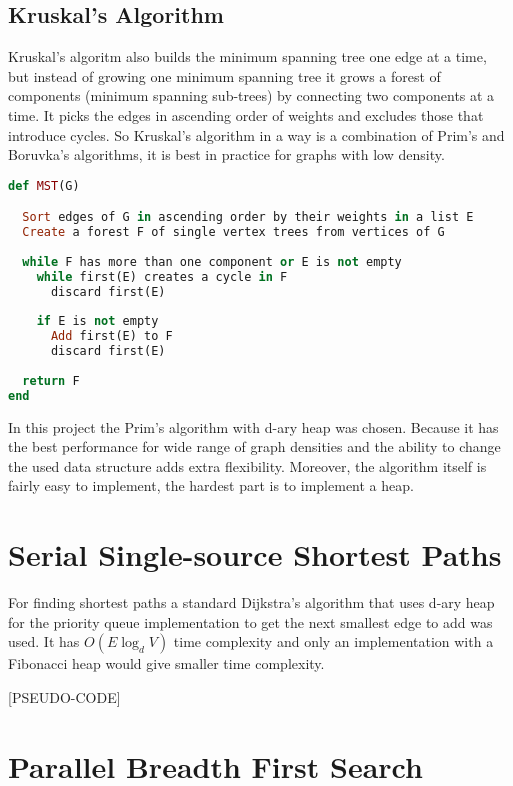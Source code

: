 \documentclass{report}
\theoremstyle{plain}
\theoremstyle{definition}
\theoremstyle{remark}
\begin{document}
\subsection*{Kruskal's Algorithm}
Kruskal's algoritm also builds the minimum spanning tree one edge at a time, but instead of growing one minimum spanning tree it grows a forest of components (minimum spanning sub-trees) by connecting two components at a time. It picks the edges in ascending order of weights and excludes those that introduce cycles. So Kruskal's algorithm in a way is a combination of Prim's and Boruvka's algorithms, it is best in practice for graphs with low density.

\begin{lstlisting}[language=Ruby]
def MST(G)

  Sort edges of G in ascending order by their weights in a list E
  Create a forest F of single vertex trees from vertices of G
  
  while F has more than one component or E is not empty
    while first(E) creates a cycle in F
      discard first(E)
      
    if E is not empty
      Add first(E) to F
      discard first(E)      
  
  return F
end
\end{lstlisting}

In this project the Prim's algorithm with d-ary heap was chosen. Because it has the best performance for wide range of graph densities and 
the ability to change the used data structure adds extra flexibility. Moreover, the algorithm itself is fairly easy to implement, the hardest part is to implement a heap.

\section{Serial Single-source Shortest Paths}

For finding shortest paths a standard Dijkstra's algorithm that uses d-ary heap for the priority queue implementation to get the next smallest edge to add was used. It has $O(E\log_dV)$ time complexity and only an implementation with a Fibonacci heap would give smaller time complexity.

[PSEUDO-CODE]

\section{Parallel Breadth First Search}
\end{document}
